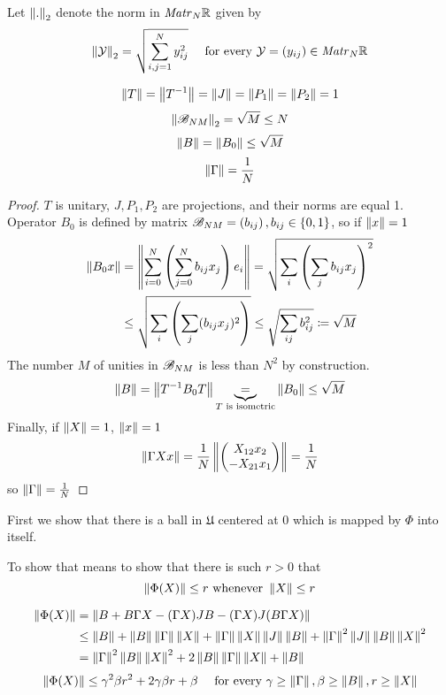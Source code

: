 \documentclass{article}
\begin{document}
Let \( \normex{2}{.} \) denote the norm in \( \matr{N}{\RR} \) given by
\[\normex{2}{\mathcal Y} = \sqrt{\sum_{i,j=1}^N y_{ij}^2} \quad\text{ for every } \mathcal Y = \left(y_{ij}\right) \in \matr{N}{\RR}\]
\begin{lemma}
    \[\norm T = \norm{T^{-1}} = \norm J = \norm{P_1} = \norm{P_2} = 1\]
    \[\normex{2}{\perturbmatrix{N}{M}} = \sqrt{M} \leq N\]
    \[\norm B = \norm{B_0} \leq \sqrt M\]
    \[\norm{\Gamma} = \frac{1}{N}\]
\end{lemma}
\begin{proof}
    \( T \) is unitary, \( J, P_1, P_2 \) are projections, and their norms are equal 1.
    Operator \( B_0 \) is defined by matrix \( \perturbmatrix{N}{M} = \left(b_{ij}\right), b_{ij}\in\{0,1\} \),
    so if \( \norm x = 1 \)
    \[
        \begin{split}
            \norm{B_0 x} &= \norm{\sum_{i=0}^N \left(\sum_{j=0}^N b_{ij} x_j\right) e_i}
            = \sqrt{\sum_i \left(\sum_j b_{ij} x_j\right)^2} \\
            &\leq \sqrt{\sum_i \left(\sum_j (b_{ij} x_j)^2\right)}
            \leq \sqrt{\sum_{ij} b_{ij}^2} \eqdef \sqrt M
        \end{split}
    \]
The number \( M \) of unities in \( \perturbmatrix{N}{M} \) is less than \( N^2 \) by construction.
\[\norm B = \norm{T^{-1} B_0 T} \underbrace{=}_{T \text{ is isometric}} \norm{B_0} \leq \sqrt M\]
    Finally, if \( \norm X = 1 \), \( \norm x = 1 \)
    \[\norm{\Gamma X x} = \frac1N \norm{\begin{pmatrix}X_{12}x_2 \\ -X_{21}x_1\end{pmatrix}} = \frac1N\]
    so \( \norm\Gamma = \frac1N \)
\end{proof}

First we show that there is a ball in \( \mathfrak U \) centered at \( 0 \)
which is mapped by \( \Phi \) into itself.

To show that
means to show that there is such \( r>0 \) that
\[\norm{\Phi(X)} \leq r \text{ whenever } \norm{X}\leq r\]

    \begin{align*}
        \norm{\Phi(X)} &=    \norm{B + B\Gamma X - (\Gamma X) JB - (\Gamma X)J(B\Gamma X)} \\
                     &\leq \norm{B} + \norm{B}\norm{\Gamma} \norm{X} + \norm{\Gamma}\norm{X}\norm{J}\norm{B} + \norm{\Gamma}^2\norm{J}\norm{B}\norm{X}^2 \\
                     & = \norm{\Gamma}^2\norm{B}\norm{X}^2 + 2\norm{B}\norm{\Gamma}\norm{X} + \norm{B}
    \end{align*}
    \begin{equation}
        \label{eq:phi_norm_b1}
        \norm{\Phi(X)}
        \leq
            \gamma^2\beta r^2 + 2\gamma\beta r + \beta
            \quad \text{ for every } \gamma\geq\norm{\Gamma}, \beta\geq\norm{B}, r\geq\norm{X}
    \end{equation}
\end{document}

